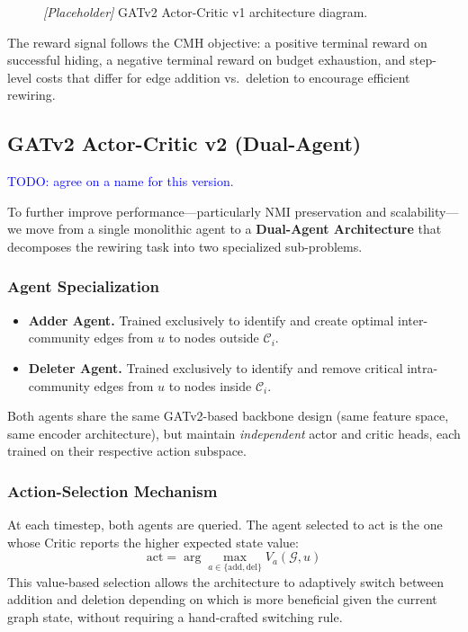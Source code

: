 \documentclass[twocolumn,a4paper]{article}
\begin{document}
\begin{figure}[h]
  \centering
  \fbox{\rule{0pt}{4.5cm}\rule{\linewidth}{0pt}}
  \caption{\textit{[Placeholder]} GATv2 Actor-Critic v1 architecture diagram.}
  \label{fig:ac-v1}
\end{figure}

The reward signal follows the CMH objective: a positive terminal reward on
successful hiding, a negative terminal reward on budget exhaustion, and
step-level costs that differ for edge addition vs.\ deletion to encourage
efficient rewiring.


\subsection{GATv2 Actor-Critic v2 (Dual-Agent)}
\textcolor{blue}{TODO: agree on a name for this version.}

To further improve performance—particularly NMI preservation and scalability—we
move from a single monolithic agent to a \textbf{Dual-Agent Architecture} that
decomposes the rewiring task into two specialized sub-problems.

\subsubsection*{Agent Specialization}

\begin{itemize}
  \item \textbf{Adder Agent.} Trained exclusively to identify and create optimal
    inter-community edges from $u$ to nodes outside $\mathcal{C}_i$.
  \item \textbf{Deleter Agent.} Trained exclusively to identify and remove
    critical intra-community edges from $u$ to nodes inside $\mathcal{C}_i$.
\end{itemize}

Both agents share the same GATv2-based backbone design (same feature space,
same encoder architecture), but maintain \emph{independent} actor and critic
heads, each trained on their respective action subspace.

\subsubsection*{Action-Selection Mechanism}

At each timestep, both agents are queried. The agent selected to act is the one
whose Critic reports the higher expected state value:
\[
  \text{act} = \arg\max_{a \in \{\text{add}, \text{del}\}} V_a(\mathcal{G}, u)
\]
This value-based selection allows the architecture to adaptively switch between
addition and deletion depending on which is more beneficial given the current
graph state, without requiring a hand-crafted switching rule.
\end{document}
